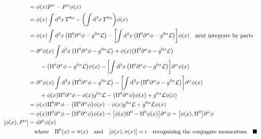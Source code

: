 \documentclass{article}
\begin{document}
\begin{align*}
  [\phi(x),P^\alpha] & =\phi(x)P^\alpha-P^\alpha \phi(x)                                                                                                                                                               \\
                     & =\phi(x)\int\dd[3]{x}T^{0\alpha}-\pqty{\int\dd[3]{x}T^{0\alpha}} \phi(x)                                                                                                                        \\
                     & =\phi(x)\int\dd[3]{x}\pqty{\Pi^0\partial^\alpha \phi-g^{0\alpha}\mathcal{L}}-\bqty{\int\dd[3]{x}\pqty{\Pi^0\partial^\alpha \phi-g^{0\alpha}\mathcal{L}}} \phi(x)\qq{next integrate by parts}    \\
                     & =\partial^\alpha \phi(x)\int\dd[3]{x}\pqty{\Pi^0\partial^\alpha \phi-g^{0\alpha}\mathcal{L}}+\phi(x)\pqty{\Pi^0\partial^\alpha \phi-g^{0\alpha}\mathcal{L}}                                     \\
                     & \qquad-\pqty{\Pi^0\partial^\alpha \phi-g^{0\alpha}\mathcal{L}}\phi(x)-\bqty{\int\dd[3]{x}\pqty{\Pi^0\partial^\alpha \phi-g^{0\alpha}\mathcal{L}}} \partial^\alpha\phi(x)                        \\
                     & =\partial^\alpha \phi(x)\int\dd[3]{x}\pqty{\Pi^0\partial^\alpha \phi-g^{0\alpha}\mathcal{L}}-\bqty{\int\dd[3]{x}\pqty{\Pi^0\partial^\alpha \phi-g^{0\alpha}\mathcal{L}}} \partial^\alpha\phi(x) \\
                     & \qquad +\phi(x)\Pi^0\partial^\alpha \phi-\phi(x)g^{0\alpha}\mathcal{L}-\pqty{\Pi^0\partial^\alpha \phi}\phi(x)+g^{0\alpha}\mathcal{L}\phi(x)                                                    \\
                     & =\phi(x)\Pi^0\partial^\alpha \phi-\pqty{\Pi^0\partial^\alpha \phi}\phi(x)-\phi(x)g^{0\alpha}\mathcal{L}+g^{0\alpha}\mathcal{L}\phi(x)                                                           \\
                     & =\phi(x)\Pi^0\partial^\alpha \phi-\pqty{\Pi^0\partial^\alpha \phi}\phi(x)=\bqty{\phi(x)\Pi^0-\Pi^0 \phi(x)}\partial^\alpha \phi=\bqty{\phi(x),\Pi^0}\partial^\alpha \phi                        \\
  [\phi(x),P^\alpha] & =i\partial^\alpha \phi   (x)                                                                                                                                                                    \\
                     & \qq{where}\Pi^0(x)=\pi(x)\qand\bqty{\phi(x),\pi(x)}=i\qq{recognizing the conjugate momentum}\blacksquare
\end{align*}
\end{document}

